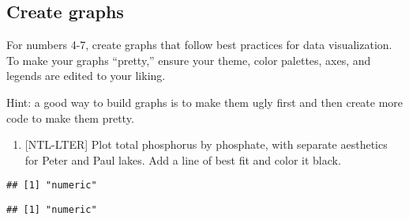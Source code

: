 \documentclass[]{article}
\newenvironment{Shaded}{\begin{snugshade}}{\end{snugshade}}
\newcommand{\KeywordTok}[1]{\textcolor[rgb]{0.13,0.29,0.53}{\textbf{#1}}}
\newcommand{\CommentTok}[1]{\textcolor[rgb]{0.56,0.35,0.01}{\textit{#1}}}
\newcommand{\OperatorTok}[1]{\textcolor[rgb]{0.81,0.36,0.00}{\textbf{#1}}}
\newcommand{\NormalTok}[1]{#1}
\providecommand{\tightlist}{%
  \setlength{\itemsep}{0pt}\setlength{\parskip}{0pt}}
\begin{document}
\subsection{Create graphs}\label{create-graphs}

For numbers 4-7, create graphs that follow best practices for data
visualization. To make your graphs ``pretty,'' ensure your theme, color
palettes, axes, and legends are edited to your liking.

Hint: a good way to build graphs is to make them ugly first and then
create more code to make them pretty.

\begin{enumerate}
\def\labelenumi{\arabic{enumi}.}
\setcounter{enumi}{3}
\tightlist
\item
  {[}NTL-LTER{]} Plot total phosphorus by phosphate, with separate
  aesthetics for Peter and Paul lakes. Add a line of best fit and color
  it black.
\end{enumerate}

\begin{Shaded}
\end{Shaded}

\begin{verbatim}
## [1] "numeric"
\end{verbatim}

\begin{Shaded}
\end{Shaded}

\begin{verbatim}
## [1] "numeric"
\end{verbatim}
\end{document}
